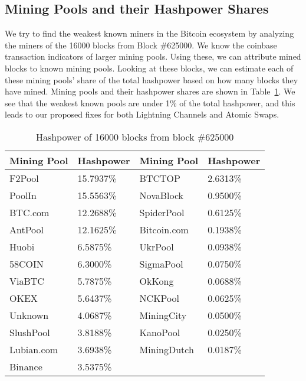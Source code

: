 \documentclass[runningheads]{llncs}
\begin{document}
\subsection{Mining Pools and their Hashpower Shares}\label{section:mining_pools}

We try to find the weakest known miners in the Bitcoin ecosystem by analyzing the miners of the 16000 blocks from Block \#625000. We know the coinbase transaction indicators of larger mining pools. Using these, we can attribute mined blocks to known mining pools. Looking at these blocks, we can estimate each of these mining pools' share of the total hashpower based on how many blocks they have mined. Mining pools and their hashpower shares are shown in Table~\ref{table:mining_powers}. We see that the weakest known pools are under 1\% of the total hashpower, and this leads to our proposed fixes for both Lightning Channels and Atomic Swaps. 

\begin{table}[ht]
\caption{Hashpower of 16000 blocks from block \#625000} 
\centering
\begin{tabular}{|l|l|l|l|}
\hline
        Mining Pool & Hashpower & Mining Pool & Hashpower \\
\hline
 F2Pool     & 15.7937\% & BTCTOP      & 2.6313\% \\
 PoolIn     & 15.5563\% & NovaBlock   & 0.9500\% \\
 BTC.com    & 12.2688\% & SpiderPool  & 0.6125\% \\
 AntPool    & 12.1625\% & Bitcoin.com & 0.1938\% \\
 Huobi      & 6.5875\%  & UkrPool     & 0.0938\% \\
 58COIN     & 6.3000\%  & SigmaPool   & 0.0750\% \\
 ViaBTC     & 5.7875\%  & OkKong      & 0.0688\% \\
 OKEX       & 5.6437\%  & NCKPool     & 0.0625\% \\
 Unknown    & 4.0687\%  & MiningCity  & 0.0500\% \\
 SlushPool  & 3.8188\%  & KanoPool    & 0.0250\% \\
 Lubian.com & 3.6938\%  & MiningDutch & 0.0187\% \\
 Binance    & 3.5375\%  &             &         \\
\hline
\end{tabular}
\label{table:mining_powers}
\end{table}
\end{document}
